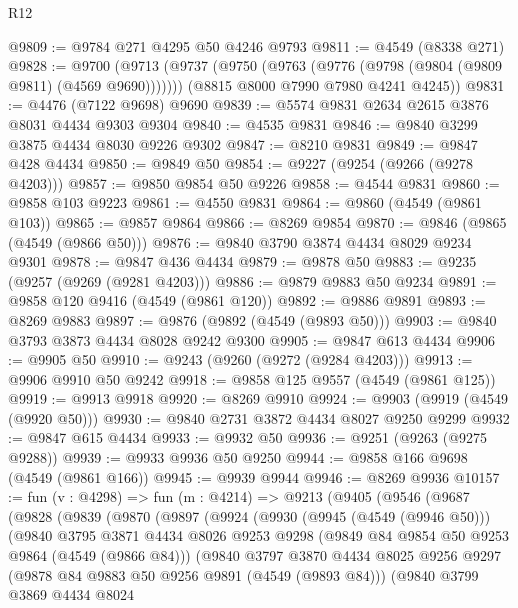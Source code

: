 \begin{lexlean}{R12}
\begin{coremodule}
@9809 := @9784 @271 @4295 @50 @4246 @9793
@9811 := @4549 (@8338 @271)
@9828 := @9700
    (@9713
      (@9737 (@9750 (@9763 (@9776 (@9798 (@9804 (@9809 @9811) (@4569 @9690)))))))
      (@8815 @8000 @7990 @7980 @4241 @4245))
@9831 := @4476 (@7122 @9698) @9690
@9839 := @5574 @9831 @2634 @2615 @3876 @8031 @4434 @9303 @9304
@9840 := @4535 @9831
@9846 := @9840 @3299 @3875 @4434 @8030 @9226 @9302
@9847 := @8210 @9831
@9849 := @9847 @428 @4434
@9850 := @9849 @50
@9854 := @9227 (@9254 (@9266 (@9278 @4203)))
@9857 := @9850 @9854 @50 @9226
@9858 := @4544 @9831
@9860 := @9858 @103 @9223
@9861 := @4550 @9831
@9864 := @9860 (@4549 (@9861 @103))
@9865 := @9857 @9864
@9866 := @8269 @9854
@9870 := @9846 (@9865 (@4549 (@9866 @50)))
@9876 := @9840 @3790 @3874 @4434 @8029 @9234 @9301
@9878 := @9847 @436 @4434
@9879 := @9878 @50
@9883 := @9235 (@9257 (@9269 (@9281 @4203)))
@9886 := @9879 @9883 @50 @9234
@9891 := @9858 @120 @9416 (@4549 (@9861 @120))
@9892 := @9886 @9891
@9893 := @8269 @9883
@9897 := @9876 (@9892 (@4549 (@9893 @50)))
@9903 := @9840 @3793 @3873 @4434 @8028 @9242 @9300
@9905 := @9847 @613 @4434
@9906 := @9905 @50
@9910 := @9243 (@9260 (@9272 (@9284 @4203)))
@9913 := @9906 @9910 @50 @9242
@9918 := @9858 @125 @9557 (@4549 (@9861 @125))
@9919 := @9913 @9918
@9920 := @8269 @9910
@9924 := @9903 (@9919 (@4549 (@9920 @50)))
@9930 := @9840 @2731 @3872 @4434 @8027 @9250 @9299
@9932 := @9847 @615 @4434
@9933 := @9932 @50
@9936 := @9251 (@9263 (@9275 @9288))
@9939 := @9933 @9936 @50 @9250
@9944 := @9858 @166 @9698 (@4549 (@9861 @166))
@9945 := @9939 @9944
@9946 := @8269 @9936
@10157 := fun (v : @4298) =>
  fun (m : @4214) =>
  @9213
    (@9405
      (@9546
        (@9687
          (@9828
            (@9839
              (@9870
                (@9897
                  (@9924
                    (@9930
                      (@9945 (@4549 (@9946 @50)))
                      (@9840
                        @3795
                        @3871
                        @4434
                        @8026
                        @9253
                        @9298
                        (@9849 @84 @9854 @50 @9253 @9864 (@4549 (@9866 @84)))
                        (@9840
                          @3797
                          @3870
                          @4434
                          @8025
                          @9256
                          @9297
                          (@9878 @84 @9883 @50 @9256 @9891 (@4549 (@9893 @84)))
                          (@9840
                            @3799
                            @3869
                            @4434
                            @8024

\end{coremodule}
\end{lexlean}
